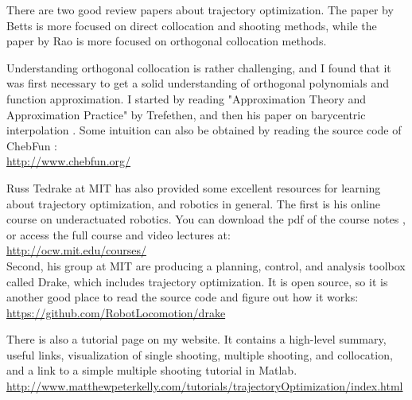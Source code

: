\par There are two good review papers about trajectory optimization. The paper by Betts \cite{Betts1998} is more focused on direct collocation and shooting methods, while the paper by Rao \cite{Rao2009} is more focused on orthogonal collocation methods.\\

\par Understanding orthogonal collocation is rather challenging, and I found that it was first necessary to get a solid understanding of orthogonal polynomials and function approximation. I started by reading "Approximation Theory and Approximation Practice" \cite{Trefethen2012} by Trefethen, and then his paper on barycentric interpolation \cite{Berrut2004a}. Some intuition can also be obtained by reading the source code of ChebFun \cite{Driscoll2014}: \\
\url{http://www.chebfun.org/}\\

\par Russ Tedrake at MIT has also provided some excellent resources for learning about trajectory optimization, and robotics in general. The first is his online course on underactuated robotics. You can download the pdf of the course notes \cite{Tedrake2009}, or access the full course and video lectures at: \\
\href{http://ocw.mit.edu/courses/electrical-engineering-and-computer-science/6-832-underactuated-robotics-spring-2009/index.htm}{http://ocw.mit.edu/courses/} \\

Second, his group at MIT are producing a planning, control, and analysis toolbox called Drake, which includes trajectory optimization. It is open source, so it is another good place to read the source code and figure out how it works: \\
\url{https://github.com/RobotLocomotion/drake}\\

\par There is also a tutorial page on my website. It contains a high-level summary, useful links, visualization of single shooting, multiple shooting, and collocation, and a link to a simple multiple shooting tutorial in Matlab. \\
\url{http://www.matthewpeterkelly.com/tutorials/trajectoryOptimization/index.html}